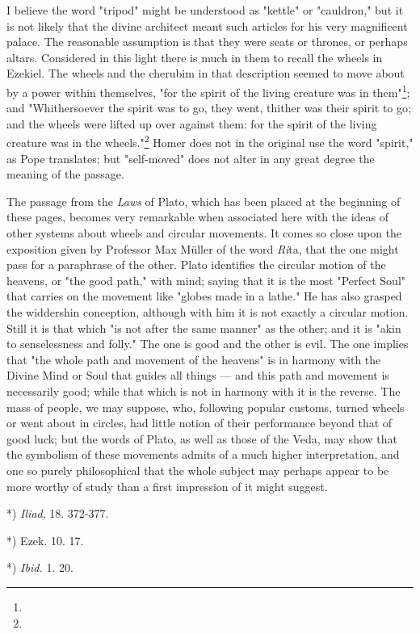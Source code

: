 \documentclass[a4paper, 11pt, oneside, polutonikogreek, english]{article}
\begin{document}
I believe the word "tripod" might be understood as "kettle" or "cauldron," but it is not likely that the divine architect meant such articles for his very magnificent palace. The reasonable assumption is that they were seats or thrones, or perhaps altars. Considered in this light there is much in them to recall the wheels in Ezekiel. The wheels and the cherubim in that description seemed to move about by a power within themselves, "for the spirit of the living creature was in them"\footnote{}; and "Whithersoever the spirit was to go, they went, thither was their spirit to go; and the wheels were lifted up over against them: for the spirit of the living creature was in the wheels."\footnote{} Homer does not in the original use the word "spirit," as Pope translates; but "self-moved" does not alter in any great degree the meaning of the passage.

The passage from the \emph{Laws} of Plato, which has been placed at the beginning of these pages, becomes very remarkable when associated here with the ideas of other systems about wheels and circular movements. It comes so close upon the exposition given by Professor Max Müller of the word \emph{Ri}ta, that the one might pass for a paraphrase of the other. Plato identifies the circular motion of the heavens, or "the good path," with mind; saying that it is the most "Perfect Soul" that carries on the movement like "globes made in a lathe." He has also grasped the widdershin conception, although with him it is not exactly a circular motion. Still it is that which "is not after the same manner" as the other; and it is "akin to senselessness and folly." The one is good and the other is evil. The one implies that "the whole path and movement of the heavens" is in harmony with the Divine Mind or Soul that guides all things --- and this path and movement is necessarily good; while that which is not in harmony with it is the reverse. The mass of people, we may suppose, who, following popular customs, turned wheels or went about in circles, had little notion of their performance beyond that of good luck; but the words of Plato, as well as those of the Veda, may show that the symbolism of these movements admits of a much higher interpretation, and one so purely philosophical that the whole subject may perhaps appear to be more worthy of study than a first impression of it might suggest.

*) \emph{Iliad}, 18. 372-377.

*) Ezek. 10. 17.

*) \emph{Ibid.} 1. 20.
\end{document}
